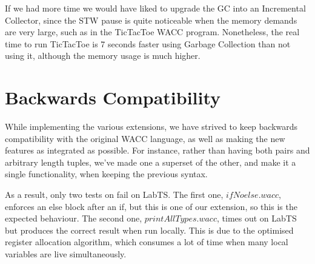 \documentclass{article}
\begin{document}
If we had more time we would have liked to upgrade the GC into an Incremental Collector, since the STW pause is quite noticeable when the memory demands are very large, such as in the TicTacToe WACC program. Nonetheless, the real time to run TicTacToe is 7 seconds faster using Garbage Collection than not using it, although the memory usage is much higher. 




\section{Backwards Compatibility}
While implementing the various extensions, we have strived to keep backwards compatibility with the original WACC language,
as well as making the new features as integrated as possible. For instance, rather than having both pairs and arbitrary length
tuples, we've made one a superset of the other, and make it a single functionality, when keeping the previous syntax.

As a result, only two tests on fail on LabTS. The first one, $ifNoelse.wacc$, enforces an else block after an if, but this
is one of our extension, so this is the expected behaviour. The second one, $printAllTypes.wacc$, times out on LabTS but
produces the correct result when run locally. This is due to the optimised register allocation algorithm, which consumes a
lot of time when many local variables are live simultaneously.
\end{document}
